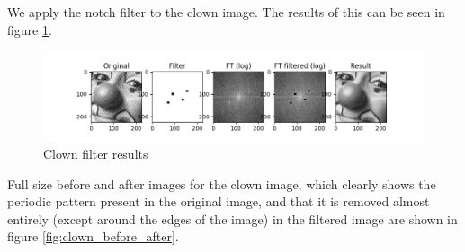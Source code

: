 \documentclass[]{article}
\begin{document}
\subsection{}
We apply the notch filter to the clown image. The results of this can be seen in figure \ref{fig:clown_results}.
\begin{figure}[H]
\centering
\includegraphics[width=\textwidth]{clown_results}
\caption{Clown filter results}
\label{fig:clown_results}
\end{figure}
Full size before and after images for the clown image, which clearly shows the periodic pattern present in the original image, and that it is removed almost entirely (except around the edges of the image) in the filtered image are shown in figure \ref{fig:clown_before_after}.
\end{document}
